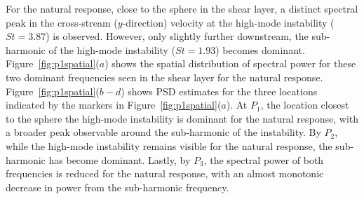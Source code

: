 \documentclass[3p]{elsarticle}
\begin{document}
For the natural response, close to the sphere in the shear layer, a
distinct spectral peak in the cross-stream ($y$-direction) velocity at the
high-mode instability ($St=3.87$) is observed. However, only slightly further
downstream, the sub-harmonic of the high-mode instability ($St=1.93$)
becomes dominant. Figure~\ref{fig:p1spatial}($a$) shows the spatial distribution of spectral power for these two dominant frequencies seen in the shear layer for the natural response. Figure~\ref{fig:p1spatial}($b-d$) shows PSD estimates for the three locations indicated by the markers in Figure~\ref{fig:p1spatial}($a$). At $P_1$, the location closest to the sphere the high-mode instability is dominant for the natural response, with a broader peak observable around the sub-harmonic of the instability. By $P_2$, while the high-mode instability remains visible for the natural response, the sub-harmonic has become dominant. Lastly, by $P_3$, the spectral power of both frequencies is reduced for the natural response, with an almost monotonic decrease in power from the sub-harmonic frequency.
\end{document}
